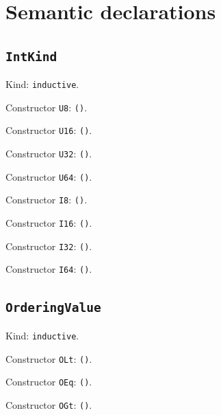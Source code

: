 \documentclass[11pt]{article}
\begin{document}
\section*{Semantic declarations}
\subsection*{\texttt{IntKind}}
\noindent Kind: \texttt{inductive}.\par
\noindent Constructor \texttt{U8}: \texttt{()}.\par
\noindent Constructor \texttt{U16}: \texttt{()}.\par
\noindent Constructor \texttt{U32}: \texttt{()}.\par
\noindent Constructor \texttt{U64}: \texttt{()}.\par
\noindent Constructor \texttt{I8}: \texttt{()}.\par
\noindent Constructor \texttt{I16}: \texttt{()}.\par
\noindent Constructor \texttt{I32}: \texttt{()}.\par
\noindent Constructor \texttt{I64}: \texttt{()}.\par
\subsection*{\texttt{OrderingValue}}
\noindent Kind: \texttt{inductive}.\par
\noindent Constructor \texttt{OLt}: \texttt{()}.\par
\noindent Constructor \texttt{OEq}: \texttt{()}.\par
\noindent Constructor \texttt{OGt}: \texttt{()}.\par
\end{document}
